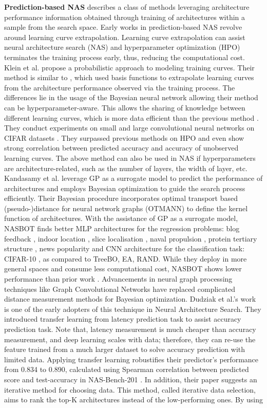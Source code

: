 \documentclass[lettersize,journal]{IEEEtran}
\begin{document}
\textbf{Prediction-based NAS} describes a class of methods leveraging architecture performance information obtained through training of architectures within a sample from the search space. Early works in prediction-based NAS revolve around learning curve extrapolation. Learning curve extrapolation can assist neural architecture search (NAS) and hyperparameter optimization (HPO) terminates the training process early, thus, reducing the computational cost. Klein et al. \cite{learningcurve} propose a probabilistic approach to modeling training curves. Their method is similar to \cite{sppedup}, which used basis functions to extrapolate learning curves from the architecture performance observed via the training process. The differences lie in the usage of the Bayesian neural network allowing their method can be hyperparameter-aware. This allows the sharing of knowledge between different learning curves, which is more data efficient than the previous method \cite{sppedup}. They conduct experiments on small and large convolutional neural networks on CIFAR datasets \cite{cifar}. They surpassed previous methods on HPO and even show strong correlation between predicted accuracy and accuracy of unobserved learning curves. The above method can also be used in NAS if hyperparameters are architecture-related, such as the number of layers, the width of  layer, etc. Kandasamy et al. \cite{nasbot} leverage GP as a surrogate model to predict the performance of architectures and employs Bayesian optimization to guide the search process efficiently. Their Bayesian procedure incorporates optimal transport based (pseudo-)distance for neural network graphs (OTMANN) to define the kernel function of architectures. With the assistance of GP as a surrogate model, NASBOT finds better MLP architectures for the regression problems: blog feedback \cite{blog}, indoor location \cite{indoor}, slice localisation \cite{slice}, naval propulsion \cite{naval}, protein tertiary structure \cite{protein}, news popularity \cite{news} and CNN architecture for the classification task: CIFAR-10 \cite{cifar}, as compared to TreeBO, EA, RAND. While they deploy in more general spaces and consume less computational cost, NASBOT shows lower performance than prior work \cite{ProgressiveNAS, HierarchicalNAS, rl1}. Advancements in neural graph processing techniques like Graph Convolutional Networks \cite{gnn} have replaced complicated distance measurement methods for Bayesian optimization. Dudziak et al.'s work \cite{BRP-NAS} is one of the early adopters of this technique in Neural Architecture Search. They introduced transfer learning from latency prediction task to assist accuracy prediction task. Note that, latency measurement is much cheaper than accuracy measurement, and deep learning scales with data; therefore, they can re-use the feature trained from a much larger dataset to solve accuracy prediction with limited data. Applying transfer learning robustifies their predictor's performance from 0.834 to 0.890, calculated using Spearman correlation between predicted score and test-accuracy in NAS-Bench-201 \cite{nb201}. In addition, their paper suggests an iterative method for choosing data. This method, called iterative data selection, aims to rank the top-K architectures instead of the low-performing ones. By using 
\end{document}
